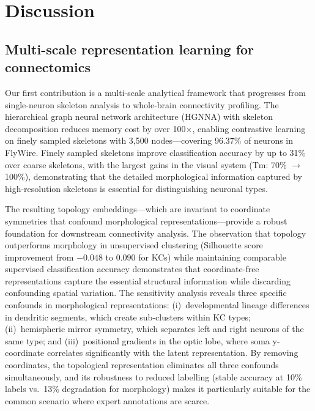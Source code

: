 \documentclass[10pt]{article}
\begin{document}
\FloatBarrier

\section*{Discussion}

\subsection*{Multi-scale representation learning for connectomics}

Our first contribution is a multi-scale analytical framework that progresses from single-neuron skeleton analysis to whole-brain connectivity profiling. The hierarchical graph neural network architecture (HGNNA) with skeleton decomposition reduces memory cost by over 100$\times$, enabling contrastive learning on finely sampled skeletons with 3,500 nodes---covering 96.37\% of neurons in FlyWire. Finely sampled skeletons improve classification accuracy by up to 31\% over coarse skeletons, with the largest gains in the visual system (Tm: 70\% $\to$ 100\%), demonstrating that the detailed morphological information captured by high-resolution skeletons is essential for distinguishing neuronal types.

The resulting topology embeddings---which are invariant to coordinate symmetries that confound morphological representations---provide a robust foundation for downstream connectivity analysis. The observation that topology outperforms morphology in unsupervised clustering (Silhouette score improvement from $-0.048$ to $0.090$ for KCs) while maintaining comparable supervised classification accuracy demonstrates that coordinate-free representations capture the essential structural information while discarding confounding spatial variation. The sensitivity analysis reveals three specific confounds in morphological representations: (i)~developmental lineage differences in dendritic segments, which create sub-clusters within KC types; (ii)~hemispheric mirror symmetry, which separates left and right neurons of the same type; and (iii)~positional gradients in the optic lobe, where soma y-coordinate correlates significantly with the latent representation. By removing coordinates, the topological representation eliminates all three confounds simultaneously, and its robustness to reduced labelling (stable accuracy at 10\% labels vs.\ 13\% degradation for morphology) makes it particularly suitable for the common scenario where expert annotations are scarce.
\end{document}
